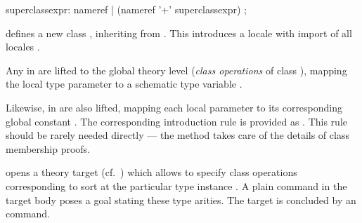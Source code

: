\begin{isabellebody}
\begin{isamarkuptext}
\begin{rail}
    superclassexpr: nameref | (nameref '+' superclassexpr)
    ;
  \end{rail}

  \begin{descr}

  \item [\mbox{\isa{\isacommand{class}}}~\isa{c\ {\isacharequal}\ superclasses\ {\isacharplus}\ body}] defines
  a new class , inheriting from .  This
  introduces a locale  with import of all locales .

  Any \mbox{} in  are lifted to the global
  theory level (\emph{class operations}  of class ), mapping the local type parameter
  \isa{{\isasymalpha}} to a schematic type variable .

  Likewise, \mbox{} in  are also lifted,
  mapping each local parameter  to its
  corresponding global constant .  The
  corresponding introduction rule is provided as .  This rule should be rarely needed directly
  --- the \mbox{} method takes care of the details of
  class membership proofs.

  \item [\mbox{\isa{\isacommand{instantiation}}}~\isa{t\ {\isacharcolon}{\isacharcolon}\ {\isacharparenleft}s\isactrlsub {\isadigit{1}}{\isacharcomma}\ {\isasymdots}{\isacharcomma}\ s\isactrlsub n{\isacharparenright}\ s\ {\isasymBEGIN}}] opens a theory target (cf.\
  ) which allows to specify class operations  corresponding to sort  at the
  particular type instance .  A plain \mbox{} command
  in the target body poses a goal stating these type arities.  The
  target is concluded by an \indexref{}{command}{end}\mbox{} command.


\end{descr}
\end{isamarkuptext}
\end{isabellebody}
